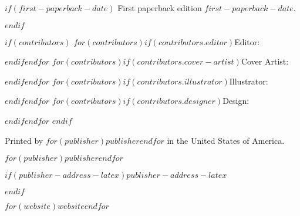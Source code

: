 \begin{singlespacing}
$if(first-paperback-date)$
\noindent  First paperback edition $first-paperback-date$. \par
\vspace{0.4cm}
$endif$

$if(contributors)$
  $for(contributors)$$if(contributors.editor)$\noindent Editor: \editor \par$endif$$endfor$
  $for(contributors)$$if(contributors.cover-artist)$\noindent Cover Artist: \coverartist \par$endif$$endfor$
  $for(contributors)$$if(contributors.illustrator)$\noindent Illustrator: \illustrator \par$endif$$endfor$
  $for(contributors)$$if(contributors.designer)$\noindent Design: \designer \par$endif$$endfor$
\vspace{0.4cm}
$endif$

\noindent Printed by $for(publisher)$$publisher$$endfor$ in the United States of America. \par
\vspace{0.4cm}

$for(publisher)$\noindent $publisher$$endfor$ \par
$if(publisher-address-latex)$\noindent $publisher-address-latex$ \par $endif$

\vspace{0.4cm}

$for(website)$\noindent $website$$endfor$

\end{singlespacing}

\vspace*{\fill}